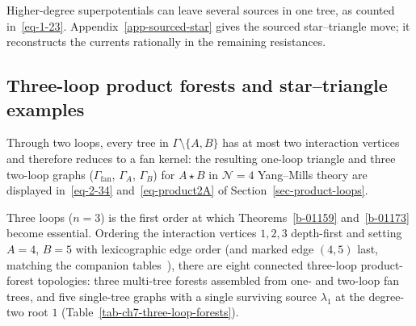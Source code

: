 \documentclass[11pt]{article}
\numberwithin{equation}{section}
\numberwithin{figure}{section}
\numberwithin{table}{section}
\begin{document}
Higher-degree superpotentials can leave several sources in one tree, as counted in~\eqref{eq-1-23}.
Appendix~\ref{app-sourced-star} gives the sourced star--triangle move; it reconstructs the currents rationally in the remaining resistances.

\subsection{Three-loop product forests and star--triangle examples}\label{sec-product-four-loops}

Through two loops, every tree in $\Gamma\setminus\{A,B\}$ has at most two interaction vertices and therefore reduces to a fan kernel: the resulting one-loop triangle and three two-loop graphs ($\Gamma_{\mathrm{fan}}$, $\Gamma_A$, $\Gamma_B$) for $A\star B$ in $\mathcal N=4$ Yang--Mills theory are displayed in~\eqref{eq-2-34} and~\eqref{eq-product2A} of Section~\ref{sec-product-loops}.

Three loops ($n=3$) is the first order at which Theorems~\ref{b-01159} and~\ref{b-01173} become essential. Ordering the interaction vertices $1,2,3$ depth-first and setting $A=4$, $B=5$ with lexicographic edge order (and marked edge $(4,5)$ last, matching the companion tables~\cite{Repo}), there are eight connected three-loop product-forest topologies: three multi-tree forests assembled from one- and two-loop fan trees, and five single-tree graphs with a single surviving source $\lambda_1$ at the degree-two root $1$ (Table~\ref{tab-ch7-three-loop-forests}).
\end{document}
